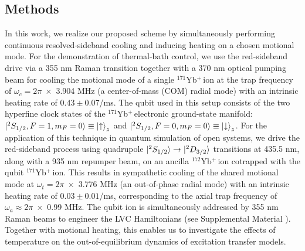 \documentclass[
reprint,
superscriptaddress,

amsmath,amssymb,
aps,
prl,

floatfix,
]{revtex4-2}
\newcommand{\Yb}{$^{171}$Yb$^+\,$}
\newcommand{\Ybc}{$^{172}$Yb$^+\,$}
\begin{document}
\subsection*{Methods}

In this work, we realize our proposed scheme by simultaneously performing continuous resolved-sideband cooling and inducing heating on a chosen motional mode. For the demonstration of thermal-bath control, we use the red-sideband drive via a 355 nm Raman transition together with a 370 nm optical pumping beam for cooling the motional mode of a single \Yb ion at the trap frequency of $\omega_c=2\pi\;\times$ 3.904 MHz (a center-of-mass (COM) radial mode) with an intrinsic heating rate of $0.43\pm0.07$/ms. The qubit used in this setup consists of the two hyperfine clock states of the \Yb electronic ground-state manifold: $\ket{^2S_{1/2}, F=1, m_F=0}\equiv\ket{\uparrow}_z$ and $\ket{^2S_{1/2}, F=0, m_F=0}\equiv\ket{\downarrow}_z$.
For the application of this technique in quantum simulation of open systems, we drive the red-sideband process using quadrupole $\ket{^2S_{1/2}}\rightarrow\ket{^2D_{3/2}}$ transitions at 435.5 nm, along with a 935 nm repumper beam, on an ancilla \Ybc ion cotrapped with the qubit \Yb ion. This results in sympathetic cooling of the shared motional mode at $\omega_t =2\pi\;\times$ 3.776 MHz (an out-of-phase radial mode) with an intrinsic heating rate of $0.03\pm0.01$/ms, corresponding to the axial trap frequency of $\omega_a\approx2\pi\;\times$ 0.99 MHz. The qubit ion is simultaneously addressed by 355 nm Raman beams to engineer the LVC Hamiltonians \cite{so2024electrontransfer,so2025multimode} (see Supplemental Material \cite{so2025fT_supp}). Together with motional heating, this enables us to investigate the effects of temperature on the out-of-equilibrium dynamics of excitation transfer models.
\end{document}
